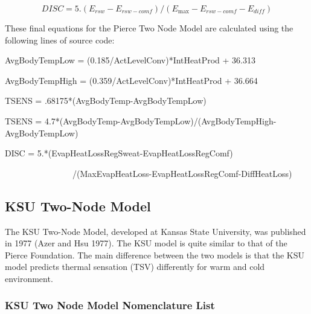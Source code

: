 \begin{equation}
DISC = 5.({E_{rsw}} - {E_{rsw - comf}})/({E_{\max }} - {E_{rsw - comf}} - {E_{diff}})
\end{equation}

These final equations for the Pierce Two Node Model are calculated using the following lines of source code:

AvgBodyTempLow = (0.185/ActLevelConv)*IntHeatProd + 36.313

AvgBodyTempHigh = (0.359/ActLevelConv)*IntHeatProd + 36.664

TSENS = .68175*(AvgBodyTemp-AvgBodyTempLow)

TSENS = 4.7*(AvgBodyTemp-AvgBodyTempLow)/(AvgBodyTempHigh-AvgBodyTempLow)

DISC = 5.*(EvapHeatLossRegSweat-EvapHeatLossRegComf)

~~~~~~~~~~~~~~~~/(MaxEvapHeatLoss-EvapHeatLossRegComf-DiffHeatLoss)

\subsection{KSU Two-Node Model}\label{ksu-two-node-model}

The KSU Two-Node Model, developed at Kansas State University, was published in 1977 (Azer and Hsu 1977). The KSU model is quite similar to that of the Pierce Foundation. The main difference between the two models is that the KSU model predicts thermal sensation (TSV) differently for warm and cold environment.

\subsubsection{KSU Two Node Model Nomenclature List}\label{ksu-two-node-model-nomenclature-list}

